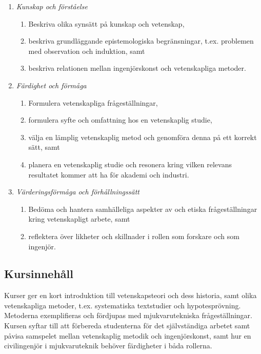 \begin{enumerate}
\def\labelenumi{\Alph{enumi}.}
\tightlist
\item
  \emph{Kunskap och förståelse}

  \begin{enumerate}
  \def\labelenumii{\Alph{enumi}.\arabic{enumii}.}
  \tightlist
  \item
    Beskriva olika synsätt på kunskap och vetenskap,
  \item
    beskriva grundläggande epistemologiska begränsningar, t.ex.
    problemen med observation och induktion, samt
  \item
    beskriva relationen mellan ingenjörskonst och vetenskapliga metoder.
  \end{enumerate}
\item
  \emph{Färdighet och förmåga}

  \begin{enumerate}
  \def\labelenumii{\Alph{enumi}.\arabic{enumii}.}
  \tightlist
  \item
    Formulera vetenskapliga frågeställningar,
  \item
    formulera syfte och omfattning hos en vetenskaplig studie,
  \item
    välja en lämplig vetenskaplig metod och genomföra denna på ett
    korrekt sätt, samt
  \item
    planera en vetenskaplig studie och resonera kring vilken relevans
    resultatet kommer att ha för akademi och industri.
  \end{enumerate}
\item
  \emph{Värderingsförmåga och förhållningssätt}

  \begin{enumerate}
  \def\labelenumii{\Alph{enumi}.\arabic{enumii}.}
  \tightlist
  \item
    Bedöma och hantera samhälleliga aspekter av och etiska
    frågeställningar kring vetenskapligt arbete, samt
  \item
    reflektera över likheter och skillnader i rollen som forskare och
    som ingenjör.
  \end{enumerate}
\end{enumerate}

\subsection*{Kursinnehåll}

Kurser ger en kort introduktion till vetenskapsteori och dess historia,
samt olika vetenskapliga metoder, t.ex. systematiska textstudier och
hypotesprövning. Metoderna exemplifieras och fördjupas med
mjukvarutekniska frågeställningar. Kursen syftar till att förbereda
studenterna för det självständiga arbetet samt påvisa samspelet mellan
vetenskaplig metodik och ingenjörskonst, samt hur en civilingenjör i
mjukvaruteknik behöver färdigheter i båda rollerna.

